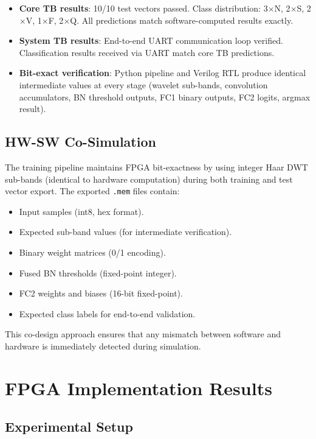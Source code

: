 \documentclass[conference]{IEEEtran}
\begin{document}
\begin{itemize}
    \item \textbf{Core TB results}: 10/10 test vectors passed. Class distribution: 3$\times$N, 2$\times$S, 2$\times$V, 1$\times$F, 2$\times$Q. All predictions match software-computed results exactly.
    \item \textbf{System TB results}: End-to-end UART communication loop verified. Classification results received via UART match core TB predictions.
    \item \textbf{Bit-exact verification}: Python pipeline and Verilog RTL produce identical intermediate values at every stage (wavelet sub-bands, convolution accumulators, BN threshold outputs, FC1 binary outputs, FC2 logits, argmax result).
\end{itemize}

\subsection{HW-SW Co-Simulation}

The training pipeline maintains FPGA bit-exactness by using integer Haar DWT sub-bands (identical to hardware computation) during both training and test vector export. The exported \texttt{.mem} files contain:
\begin{itemize}
    \item Input samples (int8, hex format).
    \item Expected sub-band values (for intermediate verification).
    \item Binary weight matrices (0/1 encoding).
    \item Fused BN thresholds (fixed-point integer).
    \item FC2 weights and biases (16-bit fixed-point).
    \item Expected class labels for end-to-end validation.
\end{itemize}

This co-design approach ensures that any mismatch between software and hardware is immediately detected during simulation.

\section{FPGA Implementation Results}

\subsection{Experimental Setup}
\end{document}

